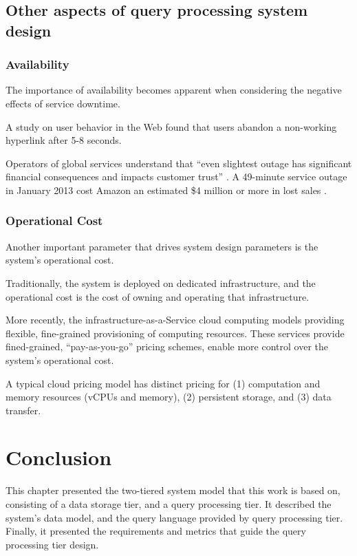 \subsection{Other aspects of query processing system design}

\subsubsection{Availability}
The importance of availability becomes apparent when considering the negative effects of service downtime.

A study on user behavior in the Web \cite{nah:waitingtime} found that users abandon a non-working hyperlink after
5-8 seconds.

Operators of global services understand that ``even slightest outage has significant financial
consequences and impacts customer trust'' \cite{deCandia:dynamo}.
A 49-minute service outage in January 2013 cost Amazon an estimated \$4 million or more in lost sales
\cite{infoworld:cloudoutages}.

\subsubsection{Operational Cost}
Another important parameter that drives system design parameters is the system's operational cost.

Traditionally, the system is deployed on dedicated infrastructure,
and the operational cost is the cost of owning and operating that infrastructure.

More recently, the infrastructure-as-a-Service cloud computing models providing flexible, fine-grained provisioning of computing resources.
These services provide fined-grained, ``pay-as-you-go'' pricing schemes, enable more control over the system's operational cost.

A typical cloud pricing model \cite{aws:pricing} has distinct pricing for (1) computation and memory resources
(vCPUs and memory), (2) persistent storage, and (3) data transfer.


\section{Conclusion}

This chapter presented the two-tiered system model that this work is based on, consisting of a data storage tier,
and a query processing tier.
It described the system's data model,
and the query language provided by query processing tier.
Finally, it presented the requirements and metrics that guide the query processing tier design.


% 
% 